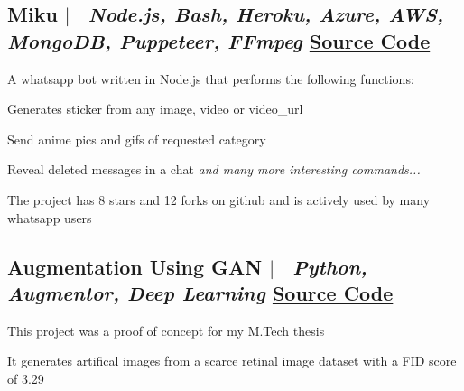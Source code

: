 \documentclass[10pt]{article}
\begin{document}
\subsection*{
  Miku 
  $|$
  \normalsize \normalfont \ \textit{Node.js, Bash, Heroku, Azure, AWS, MongoDB, Puppeteer, FFmpeg}
  \hfill 
  \normalsize \href{https://github.com/HARSH-SHETH/miku}{Source Code}
}
  A whatsapp bot written in Node.js that performs the following functions: 
  \begin{description}
    \setlength{\itemsep}{0em}
    \setlength{\itemindent}{2\parindent}
    \item[$\bullet$]{Generates sticker from any image, video or video\_url}
    \item[$\bullet$]{ Send anime pics and gifs of requested category}
    \item[$\bullet$]{ Reveal deleted messages in a chat \emph{and many more interesting commands...}}
    \item[$\bullet$]{The project has 8 stars and 12 forks on github and is actively used by many whatsapp users}
  \end{description}

\subsection*{
  Augmentation Using GAN
  $|$ 
  \normalsize \normalfont \ \textit{Python, Augmentor, Deep Learning}
  \hfill
  \normalsize {\href{https://colab.research.google.com/drive/1xpEySf_EDrDfJiunTFyRCtO-xXb8KKOq?usp=sharing}{Source Code}}
}
  \begin{description}
    \setlength{\itemsep}{0em}
    \setlength{\itemindent}{2\parindent}
    \item[$\bullet$]{This project was a proof of concept for my M.Tech thesis}
    \item[$\bullet$]{It generates artifical images from a scarce retinal image dataset with a FID score of 3.29}
  \end{description}
\end{document}
